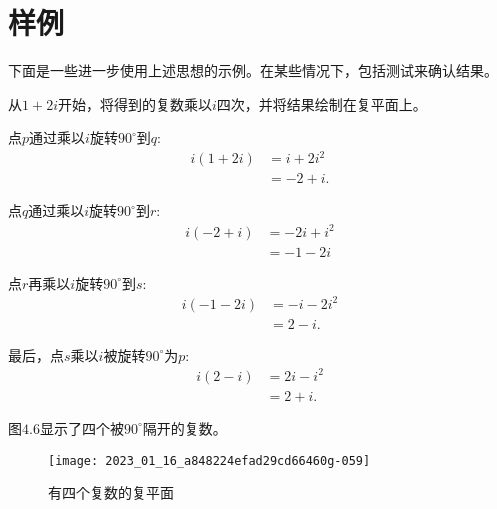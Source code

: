 \section{样例}
下面是一些进一步使用上述思想的示例。在某些情况下，包括测试来确认结果。
\begin{example}
    
    从$1+2 i$开始，将得到的复数乘以$i$四次，并将结果绘制在复平面上。
    
    点$p$通过乘以$i$旋转$90^{\circ}$到$q$:
    $$
    \begin{aligned}
    i(1+2 i) & =i+2 i^{2} \\
    & =-2+i .
    \end{aligned}
    $$
    
    点$q$通过乘以$i$旋转$90^{\circ}$到$r$:
    $$
    \begin{aligned}
    i(-2+i) & =-2 i+i^{2} \\
    & =-1-2 i
    \end{aligned}
    $$
    
    点$r$再乘以$i$旋转$90^{\circ}$到$s$:
    $$
    \begin{aligned}
    i(-1-2 i) & =-i-2 i^{2} \\
    & =2-i .
    \end{aligned}
    $$
    
    最后，点$s$乘以$i$被旋转$90^{\circ}$为$p$:
    $$
    \begin{aligned}
    i(2-i) & =2 i-i^{2} \\
    & =2+i .
    \end{aligned}
    $$
    
    图$4.6$显示了四个被$90^{\circ}$隔开的复数。
    \begin{figure}[h!]
        \centering
        \texttt{[image: 2023\_01\_16\_a848224efad29cd66460g-059]}
        \caption{有四个复数的复平面}
    \end{figure}
\end{example}

